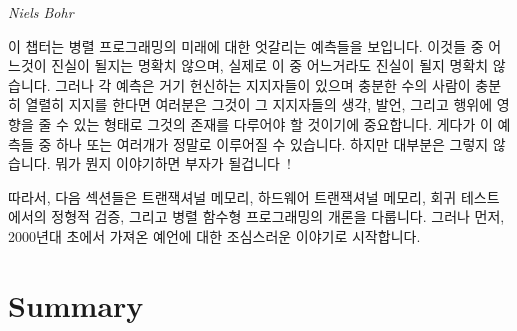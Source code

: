 
%
	 {\emph{Niels Bohr}}

이 챕터는 병렬 프로그래밍의 미래에 대한 엇갈리는 예측들을 보입니다.
이것들 중 어느것이 진실이 될지는 명확치 않으며, 실제로 이 중 어느거라도 진실이
될지 명확치 않습니다.
그러나 각 예측은 거기 헌신하는 지지자들이 있으며 충분한 수의 사람이 충분히
열렬히 지지를 한다면 여러분은 그것이 그 지지자들의 생각, 발언, 그리고 행위에
영향을 줄 수 있는 형태로 그것의 존재를 다루어야 할 것이기에 중요합니다.
게다가 이 예측들 중 하나 또는 여러개가 정말로 이루어질 수 있습니다.
하지만 대부분은 그렇지 않습니다.
뭐가 뭔지 이야기하면 부자가 될겁니다~\cite{KeithRSpitz1977}!

따라서, 다음 섹션들은 트랜잭셔널 메모리, 하드웨어 트랜잭셔널 메모리, 회귀
테스트에서의 정형적 검증, 그리고 병렬 함수형 프로그래밍의 개론을 다룹니다.
그러나 먼저, 2000년대 초에서 가져온 예언에 대한 조심스러운 이야기로 시작합니다.

\iffalse

This chapter presents some conflicting visions of the future of parallel
programming.
It is not clear which of these will come to pass, in fact, it is not
clear that any of them will.
They are nevertheless important because each vision has its devoted
adherents, and if enough people believe in something fervently enough,
you will need to deal with that thing's existence in the form of its
influence on the thoughts, words, and deeds of its adherents.
Besides which, one or more of these visions will actually come to pass.
But most are bogus.
Tell which is which and you'll be rich~\cite{KeithRSpitz1977}!

Therefore, the following sections give an overview of transactional
memory, hardware transactional memory,
formal verification in regression testing, and
parallel functional programming.
But first, a cautionary tale on prognostication taken from the early 2000s.

\fi


\IfTwoColumn{}{\FloatBarrier}

\IfTwoColumn{}{\FloatBarrier}




\section{Summary}
\label{sec:future:Summary}

